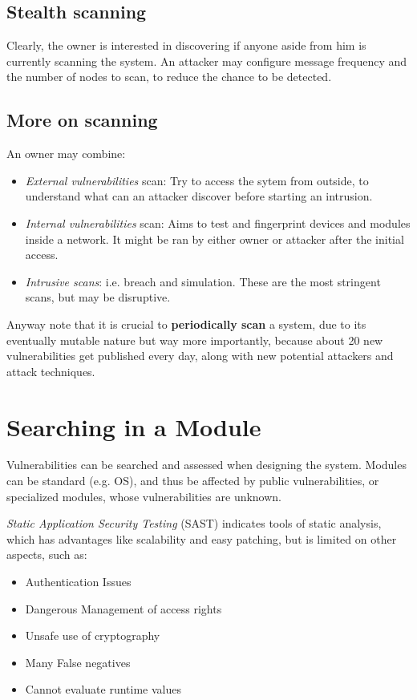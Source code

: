 \subsection{Stealth scanning}
Clearly, the owner is interested in discovering if anyone aside from him is currently scanning the system.
An attacker may configure message frequency and the number of nodes to scan, to reduce the chance to be detected.

\subsection{More on scanning}
An owner may combine:
\begin{itemize}
    \item \textit{External vulnerabilities} scan: Try to access the sytem from outside, to understand what can an attacker discover before starting an intrusion.
    \item \textit{Internal vulnerabilities} scan: Aims to test and fingerprint devices and modules inside a network.
    It might be ran by either owner or attacker after the initial access.
    \item \textit{Intrusive scans}: i.e. breach and simulation. These are the most stringent scans, but may be disruptive.
\end{itemize}

Anyway note that it is crucial to \textbf{periodically scan} a system, due to its eventually mutable nature but way more importantly, because about 20 new vulnerabilities get published every day, 
along with new potential attackers and attack techniques.

\section{Searching in a Module}
Vulnerabilities can be searched and assessed when designing the system.
Modules can be standard (e.g. OS), and thus be affected by public vulnerabilities, or specialized modules, whose vulnerabilities are unknown.


\textit{Static Application Security Testing} (SAST) indicates tools of static analysis, which has advantages like scalability and easy patching,
but is limited on other aspects, such as:
\begin{itemize}
    \item Authentication Issues
    \item Dangerous Management of access rights
    \item Unsafe use of cryptography
    \item Many False negatives
    \item Cannot evaluate runtime values
\end{itemize}

